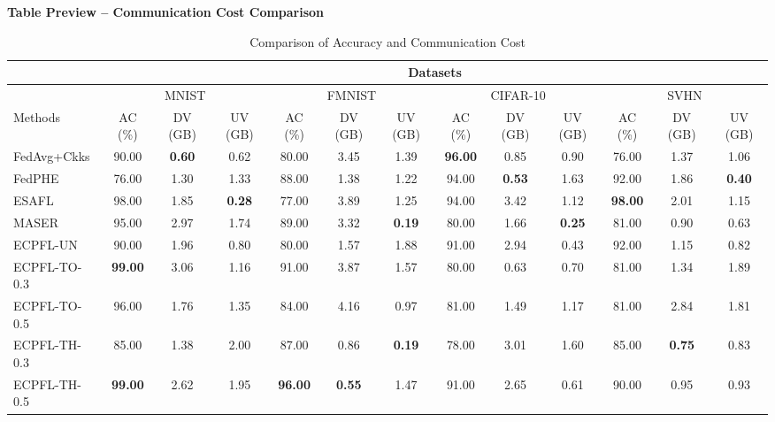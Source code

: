 \documentclass[conference]{IEEEtran}
\begin{document}
\onecolumn
\begin{center}
\Large\textbf{Table Preview -- Communication Cost Comparison}
\end{center}
\vspace{1em}
\begin{table}[t]
\centering
\caption{Comparison of Accuracy and Communication Cost}
\label{tab:comm-comparison}
\footnotesize

\begin{tabular}{l|c|c|c|c|c|c|c|c|c|c|c|c}
\hline
 & \multicolumn{12}{c|}{Datasets} \\
\hline
 & \multicolumn{3}{|c|}{MNIST} & \multicolumn{3}{|c|}{FMNIST} & \multicolumn{3}{|c|}{CIFAR-10} & \multicolumn{3}{|c|}{SVHN} \\
\hline
Methods & AC (\%) & DV (GB) & UV (GB) & AC (\%) & DV (GB) & UV (GB) & AC (\%) & DV (GB) & UV (GB) & AC (\%) & DV (GB) & UV (GB) \\
\hline
FedAvg+Ckks & 90.00 & \textbf{0.60} & 0.62 & 80.00 & 3.45 & 1.39 & \textbf{96.00} & 0.85 & 0.90 & 76.00 & 1.37 & 1.06 \\
\hline
FedPHE & 76.00 & 1.30 & 1.33 & 88.00 & 1.38 & 1.22 & 94.00 & \textbf{0.53} & 1.63 & 92.00 & 1.86 & \textbf{0.40} \\
\hline
ESAFL & 98.00 & 1.85 & \textbf{0.28} & 77.00 & 3.89 & 1.25 & 94.00 & 3.42 & 1.12 & \textbf{98.00} & 2.01 & 1.15 \\
\hline
MASER & 95.00 & 2.97 & 1.74 & 89.00 & 3.32 & \textbf{0.19} & 80.00 & 1.66 & \textbf{0.25} & 81.00 & 0.90 & 0.63 \\
\hline
ECPFL-UN & 90.00 & 1.96 & 0.80 & 80.00 & 1.57 & 1.88 & 91.00 & 2.94 & 0.43 & 92.00 & 1.15 & 0.82 \\
\hline
ECPFL-TO-0.3 & \textbf{99.00} & 3.06 & 1.16 & 91.00 & 3.87 & 1.57 & 80.00 & 0.63 & 0.70 & 81.00 & 1.34 & 1.89 \\
\hline
ECPFL-TO-0.5 & 96.00 & 1.76 & 1.35 & 84.00 & 4.16 & 0.97 & 81.00 & 1.49 & 1.17 & 81.00 & 2.84 & 1.81 \\
\hline
ECPFL-TH-0.3 & 85.00 & 1.38 & 2.00 & 87.00 & 0.86 & \textbf{0.19} & 78.00 & 3.01 & 1.60 & 85.00 & \textbf{0.75} & 0.83 \\
\hline
ECPFL-TH-0.5 & \textbf{99.00} & 2.62 & 1.95 & \textbf{96.00} & \textbf{0.55} & 1.47 & 91.00 & 2.65 & 0.61 & 90.00 & 0.95 & 0.93 \\
\hline
\end{tabular}
\end{table}
\end{document}
